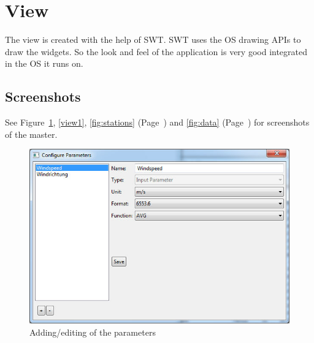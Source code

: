 
\section{View} %
\label{sec:view}

The view is created with the help of SWT. SWT uses the OS drawing APIs to draw the widgets. So the look and feel of the application is very good integrated in the OS it runs on. 

\subsection{Screenshots} %
\label{sub:screenshots}
See Figure~\ref{fig:parameter}, \ref{view1}, \ref{fig:stations} (Page~\pageref{fig:stations}) and \ref{fig:data} (Page~\pageref{fig:data}) for screenshots of the master.

\begin{figure}[ht]
    \centering
    \includegraphics[width=0.8\linewidth]{master/parameters.jpg}
    \caption{Adding/editing of the parameters}
    \label{fig:parameter}
\end{figure} 

